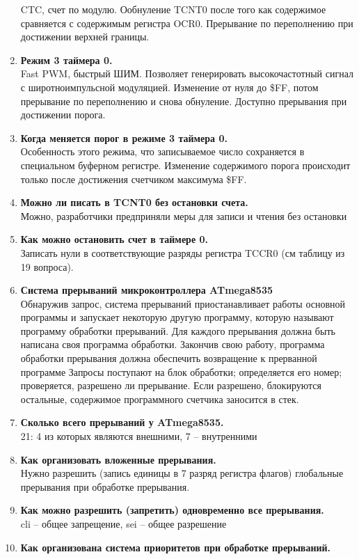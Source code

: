 \documentclass[a4paper, 12pt, twoside]{article}
\begin{document}
\begin{enumerate}
		CTC, счет по модулю. Ообнуление TCNT0 после того как содержимое сравняется с содержимым регистра OCR0. Прерывание по переполнению при достижении верхней границы.
	\item \textbf{Режим 3 таймера 0.}\\
		Fast PWM, быстрый ШИМ. Позволяет генерировать высокочастотный сигнал с широтноимпульсной модуляцией. Изменение от нуля до \$FF, потом прерывание по переполнению и снова обнуление. Доступно прерывания при достижении порога.
	\item \textbf{Когда меняется порог в режиме 3 таймера 0.}\\
		Особенность этого режима, что записываемое число сохраняется в специальном буферном регистре. Изменение содержимого порога происходит только после достижения счетчиком максимума \$FF.
	\item \textbf{Можно ли писать в TCNT0 без остановки счета.}\\
		Можно, разработчики предприняли меры для записи и чтения без остановки
	\item \textbf{Как можно остановить счет в таймере 0.}\\
		Записать нули в соответствующие разряды регистра TCCR0 (см таблицу из 19 вопроса).
	\item \textbf{Система прерываний микроконтроллера ATmega8535}\\
		Обнаружив запрос, система прерываний приостанавливает работы основной программы и запускает некоторую другую программу, которую называют программу обработки прерываний. Для каждого прерывания должна быть написана своя программа обработки. Закончив свою работу, программа обработки прерывания должна обеспечить возвращение к прерванной программе Запросы поступают на блок обработки; определяется его номер; проверяется, разрешено ли прерывание. Если разрешено, блокируются остальные, содержимое программного счетчика заносится в стек.
	\item \textbf{Сколько всего прерываний у ATmega8535.}\\
		21: 4 из которых являются внешними, 7 – внутренними 
	\item \textbf{Как организовать вложенные прерывания.}\\
		Нужно разрешить (запись единицы в 7 разряд регистра флагов) глобальные прерывания при обработке прерывания.
	\item \textbf{Как можно разрешить (запретить) одновременно все прерывания.}\\
		cli – общее запрещение, sei – общее разрешение
	\item \textbf{Как организована система приоритетов при обработке прерываний.}\\

\end{enumerate}
\end{document}
